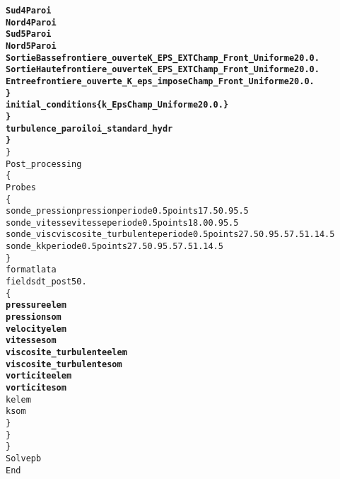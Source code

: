 \begin{alltt}
                     {\bf{Sud4 Paroi  }}
                     {\bf{Nord4 Paroi  }}
                     {\bf{Sud5 Paroi  }}
                     {\bf{Nord5 Paroi  }}
                     {\bf{SortieBasse frontiere_ouverte K_EPS_EXT Champ_Front_Uniforme 2 0. 0.  }}
                     {\bf{SortieHaute frontiere_ouverte K_EPS_EXT Champ_Front_Uniforme 2 0. 0.  }}
                     {\bf{Entree frontiere_ouverte_K_eps_impose Champ_Front_Uniforme 2 0. 0.  }}
                {\bf{\} }}
                {\bf{initial_conditions \{     k_Eps Champ_Uniforme 2 0. 0. \}  }}
            {\bf{\} }}
            {\bf{turbulence_paroi loi_standard_hydr  }}
        {\bf{\} }}
    \}
    Post_processing
    \{
        Probes 
        \{
            sonde_pression pression periode 0.5 points 1 7.5 0.9 5.5
            sonde_vitesse vitesse periode 0.5 points 1 8.0 0.9 5.5
            sonde_visc viscosite_turbulente periode 0.5 points 2 7.5 0.9 5.5 7.5 1.1 4.5
            sonde_k k periode 0.5 points 2 7.5 0.9 5.5 7.5 1.1 4.5
        \}
        format lata
        fields dt_post 50.
        \{
            {\bf{pressure elem}}
            {\bf{pression som}}
            {\bf{velocity elem}}
            {\bf{vitesse som}}
            {\bf{viscosite_turbulente elem}}
            {\bf{viscosite_turbulente som}}
            {\bf{vorticite elem}}
            {\bf{vorticite som}}
            k elem
            k som
        \}
    \}
\}
Solve pb
End
\end{alltt}
